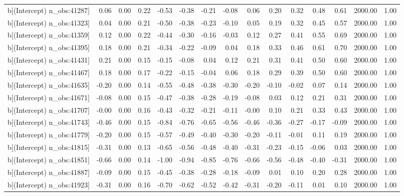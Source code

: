 \begin{table}[ht]
\begin{tabular}{rrrrrrrrrrrrrrr}
  b[(Intercept) n\_obs:41287] & 0.06 & 0.00 & 0.22 & -0.53 & -0.38 & -0.21 & -0.08 & 0.06 & 0.20 & 0.32 & 0.48 & 0.61 & 2000.00 & 1.00 \\ 
  b[(Intercept) n\_obs:41323] & 0.04 & 0.00 & 0.21 & -0.50 & -0.38 & -0.23 & -0.10 & 0.05 & 0.19 & 0.32 & 0.45 & 0.57 & 2000.00 & 1.00 \\ 
  b[(Intercept) n\_obs:41359] & 0.12 & 0.00 & 0.22 & -0.44 & -0.30 & -0.16 & -0.03 & 0.12 & 0.27 & 0.41 & 0.55 & 0.69 & 2000.00 & 1.00 \\ 
  b[(Intercept) n\_obs:41395] & 0.18 & 0.00 & 0.21 & -0.34 & -0.22 & -0.09 & 0.04 & 0.18 & 0.33 & 0.46 & 0.61 & 0.70 & 2000.00 & 1.00 \\ 
  b[(Intercept) n\_obs:41431] & 0.21 & 0.00 & 0.15 & -0.15 & -0.08 & 0.04 & 0.12 & 0.21 & 0.31 & 0.41 & 0.50 & 0.60 & 2000.00 & 1.00 \\ 
  b[(Intercept) n\_obs:41467] & 0.18 & 0.00 & 0.17 & -0.22 & -0.15 & -0.04 & 0.06 & 0.18 & 0.29 & 0.39 & 0.50 & 0.60 & 2000.00 & 1.00 \\ 
  b[(Intercept) n\_obs:41635] & -0.20 & 0.00 & 0.14 & -0.55 & -0.48 & -0.38 & -0.30 & -0.20 & -0.10 & -0.02 & 0.07 & 0.14 & 2000.00 & 1.00 \\ 
  b[(Intercept) n\_obs:41671] & -0.08 & 0.00 & 0.15 & -0.47 & -0.38 & -0.28 & -0.19 & -0.08 & 0.03 & 0.12 & 0.21 & 0.31 & 2000.00 & 1.00 \\ 
  b[(Intercept) n\_obs:41707] & -0.00 & 0.00 & 0.16 & -0.43 & -0.32 & -0.21 & -0.11 & -0.00 & 0.10 & 0.21 & 0.33 & 0.43 & 2000.00 & 1.00 \\ 
  b[(Intercept) n\_obs:41743] & -0.46 & 0.00 & 0.15 & -0.84 & -0.76 & -0.65 & -0.56 & -0.46 & -0.36 & -0.27 & -0.17 & -0.09 & 2000.00 & 1.00 \\ 
  b[(Intercept) n\_obs:41779] & -0.20 & 0.00 & 0.15 & -0.57 & -0.49 & -0.40 & -0.30 & -0.20 & -0.11 & -0.01 & 0.11 & 0.19 & 2000.00 & 1.00 \\ 
  b[(Intercept) n\_obs:41815] & -0.31 & 0.00 & 0.13 & -0.65 & -0.56 & -0.48 & -0.40 & -0.31 & -0.23 & -0.15 & -0.06 & 0.03 & 2000.00 & 1.00 \\ 
  b[(Intercept) n\_obs:41851] & -0.66 & 0.00 & 0.14 & -1.00 & -0.94 & -0.85 & -0.76 & -0.66 & -0.56 & -0.48 & -0.40 & -0.31 & 2000.00 & 1.00 \\ 
  b[(Intercept) n\_obs:41887] & -0.09 & 0.00 & 0.15 & -0.45 & -0.38 & -0.28 & -0.18 & -0.09 & 0.01 & 0.10 & 0.20 & 0.28 & 2000.00 & 1.00 \\ 
  b[(Intercept) n\_obs:41923] & -0.31 & 0.00 & 0.16 & -0.70 & -0.62 & -0.52 & -0.42 & -0.31 & -0.20 & -0.11 & 0.01 & 0.10 & 2000.00 & 1.00 \\ 

\end{tabular}
\end{table}
